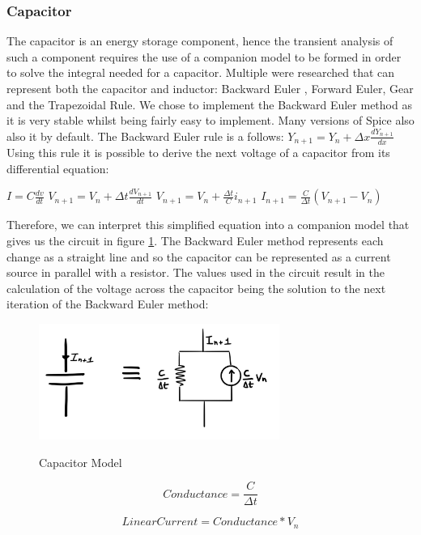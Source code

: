 \documentclass{article}
\begin{document}
\subsubsection{Capacitor}
The capacitor is an energy storage component, hence the transient analysis of such a component requires the use of a companion model to be formed in order to solve the integral needed for a capacitor. Multiple were researched\cite{NumericalMethods} that can represent both the capacitor and inductor: Backward Euler , Forward Euler, Gear and the Trapezoidal Rule\cite{IntegrationMethods}. We chose to implement the Backward Euler method as it is very stable whilst being fairly easy to implement. Many versions of Spice also also it by default. 
The Backward Euler rule is a follows: \bigbreak
$Y_{n+1} = Y_n + \Delta x\frac{dY_{n+1}}{dx}$ \bigbreak
Using this rule it is possible to derive the next voltage of a capacitor from its differential equation:
\bigbreak

$I = C\frac{dv}{dt}$
\medbreak
$V_{n+1} = V_n + \Delta t\frac{dV_{n+1}}{dt}$
\medbreak
$V_{n+1} = V_n + \frac{\Delta t}{C}i_{n+1}$
\medbreak
$I_{n+1} = \frac{C}{\Delta t}(V_{n+1}-V_n)$
\bigbreak

Therefore, we can interpret this simplified equation into a companion model that gives us the circuit in figure \ref{fig:CapModel}. The Backward Euler method represents each change as a straight line and so the capacitor can be represented as a current source in parallel with a resistor. The values used in the circuit result in the calculation of the voltage across the capacitor being the solution to the next iteration of the Backward Euler method: 

\begin{figure}[h]
    \caption{Capacitor Model}
    \centering
    \includegraphics[width=0.7\textwidth]{images/CapModel.jpg}
    \label{fig:CapModel}
\end{figure}

\bigbreak

\noindent\begin{minipage}{.4\linewidth}
\begin{equation}
  Conductance = \frac{C}{\Delta t}
\end{equation}
\end{minipage}%
\begin{minipage}{.7\linewidth}
\begin{equation}
  LinearCurrent = Conductance*V_n
\end{equation}
\end{minipage}
\end{document}
